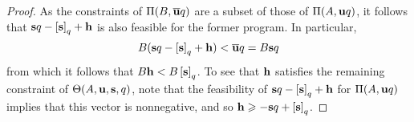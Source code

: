 \documentclass[11pt]{amsart}
\renewcommand{\!}[1]{{\color{red}\text{$\star$\,}#1\,$\star$}}
\newcommand{\ol}[1]{\overline{#1}}
\begin{document}
\begin{proof} As the constraints of $\IP(B, \ol{\vv{u}}q)$ are a subset of those of $\Pi(A, \mathbf{u}q)$, it follows that $\mathbf{s}q - \left[ \mathbf{s} \right]_q + \mathbf{h}$ is also feasible for the former program.  In particular,  
\[ B ( \vv{s}q-\tail{\vv{s}}_q + \vv{h}) < \ol{\vv{u}}q = B \vv{s}q \] 
from which it follows that $B \mathbf{h} < B \left[ \mathbf{s} \right]_q$.  To see that $\mathbf{h}$ satisfies the remaining constraint of $\Theta(A, \mathbf{u}, \mathbf{s}, q)$, note that the feasibility of $\mathbf{s}q - \left[ \mathbf{s} \right]_q + \mathbf{h}$ for $\Pi(A, \mathbf{u}q)$ implies that this vector is nonnegative, and so $\mathbf{h} \geqslant - \mathbf{s}q + \left[ \mathbf{s} \right]_q$.  
\end{proof}

%


%
%
%
\end{document}

